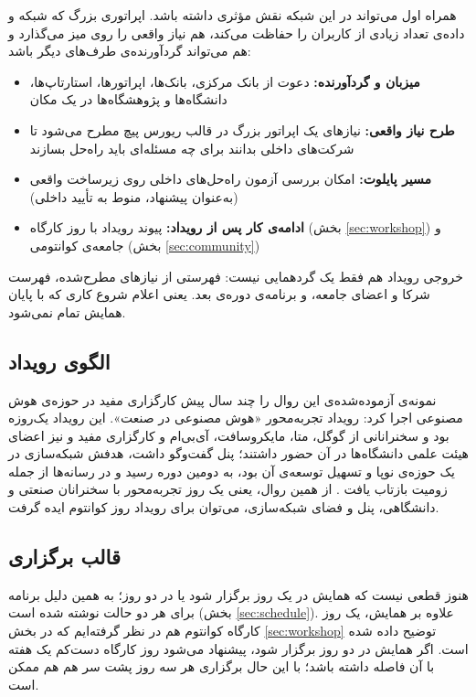 \documentclass[a4paper,12pt]{article}
\begin{document}
	همراه اول می‌تواند در این شبکه نقش مؤثری داشته باشد. اپراتوری بزرگ که شبکه و داده‌ی تعداد زیادی از کاربران را حفاظت می‌کند،
	هم نیاز واقعی را روی میز می‌گذارد و هم می‌تواند گردآورنده‌ی طرف‌های دیگر باشد:
	\begin{itemize}[rightmargin=0.5cm, itemsep=4pt]
		\item \textbf{میزبان و گردآورنده:} دعوت از بانک مرکزی، بانک‌ها، اپراتورها، استارتاپ‌ها، دانشگاه‌ها و پژوهشگاه‌ها در یک مکان
		\item \textbf{طرح نیاز واقعی:} نیازهای یک اپراتور بزرگ در قالب ریورس پیچ مطرح می‌شود تا شرکت‌های داخلی بدانند برای چه مسئله‌ای باید راه‌حل بسازند
		\item \textbf{مسیر پایلوت:} امکان بررسی آزمون راه‌حل‌های داخلی روی زیرساخت واقعی (به‌عنوان پیشنهاد، منوط به تأیید داخلی)
		\item \textbf{ادامه‌ی کار پس از رویداد:} پیوند رویداد با روز کارگاه (بخش \ref{sec:workshop}) و جامعه‌ی کوانتومی (بخش \ref{sec:community})
	\end{itemize}

	خروجی رویداد هم فقط یک گردهمایی نیست: فهرستی از نیازهای مطرح‌شده، فهرست شرکا و اعضای جامعه، و برنامه‌ی دوره‌ی بعد.
	یعنی اعلام شروع کاری که با پایان همایش تمام نمی‌شود.

	\subsection*{الگوی رویداد}
	نمونه‌ی آزموده‌شده‌ی این روال را چند سال پیش کارگزاری مفید در حوزه‌ی هوش مصنوعی اجرا کرد: رویداد تجربه‌محور «هوش مصنوعی در صنعت».
	این رویداد یک‌روزه بود و سخنرانانی از گوگل، متا، مایکروسافت، آی‌بی‌ام و کارگزاری مفید و نیز اعضای هیئت علمی دانشگاه‌ها در آن حضور داشتند؛
	پنل گفت‌وگو داشت، هدفش شبکه‌سازی در یک حوزه‌ی نوپا و تسهیل توسعه‌ی آن بود، به دومین دوره رسید و در رسانه‌ها از جمله زومیت بازتاب یافت \citep{zoomit-ai}.
	از همین روال، یعنی یک روز تجربه‌محور با سخنرانان صنعتی و دانشگاهی، پنل و فضای شبکه‌سازی، می‌توان برای رویداد روز کوانتوم ایده گرفت.

	\subsection*{قالب برگزاری}
	هنوز قطعی نیست که همایش در یک روز برگزار شود یا در دو روز؛ به همین دلیل برنامه برای هر دو حالت نوشته شده است (بخش \ref{sec:schedule}).
	علاوه بر همایش، یک روز کارگاه کوانتوم هم در نظر گرفته‌ایم که در بخش \ref{sec:workshop} توضیح داده شده است.
	اگر همایش در دو روز برگزار شود، پیشنهاد می‌شود روز کارگاه دست‌کم یک هفته با آن فاصله داشته باشد؛ با این حال برگزاری هر سه روز پشت سر هم هم ممکن است.
\end{document}
